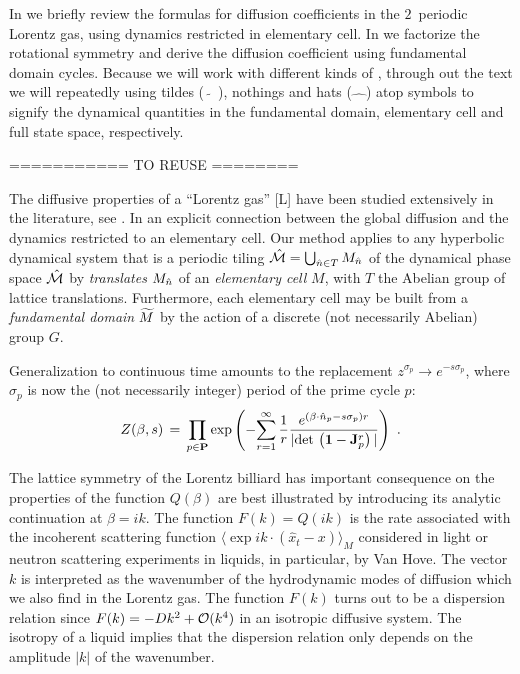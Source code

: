 
In  we briefly review the formulas for diffusion
coefficients in the $2$\dmn\ periodic Lorentz gas, using dynamics
restricted in elementary cell. In we
factorize the rotational symmetry and derive the diffusion coefficient
using fundamental domain cycles. Because we will work with different
kinds of \statesp, through out the text we will repeatedly using tildes
($\tilde{\quad}$), nothings and hats ($\hat{\quad}$) atop symbols to
signify the dynamical quantities in the fundamental domain, elementary
cell and full state space, respectively.


=========== TO REUSE ========


The diffusive properties of a ``Lorentz gas'' [L]
have been studied extensively in the literature,
see .
In   an explicit
connection between the global diffusion and the dynamics restricted to
an elementary cell.
Our method applies to any  hyperbolic dynamical system that is
a periodic tiling $\hat {{\cal M}}=\bigcup_{ \hat n \in T} M_{
\hat n}$
of the dynamical phase space $\hat {{\cal M}}$ by {\sl translates}
$M_{\hat n}$
of an {\sl elementary cell} $M$, with $T$ the Abelian group of lattice
translations.
Furthermore, each elementary cell may be built from a
{\sl fundamental domain}
${\widetilde M}$
by the action of a discrete (not necessarily Abelian) group $G$.

                                                            \toCB
Generalization to continuous time amounts to the replacement
$ z^{\sigma_p} \rightarrow e^{-s \sigma_p} $,
where $\sigma_p$ is now the (not necessarily integer)
period of the prime cycle $p$:
$$
Z(\beta,s)\,=\,\prod_{p\in\PP} \exp \left( - {
 \sum_{r=1}^\infty {1 \over r}
 { e^{(\beta \cdot \hn_p- s \sigma_p) r } %
 \over { | \det \left( {\bf 1}-{\bf J}_p^{r} \right) | } }
 } \right)
\,\, .
$$

The lattice symmetry of the Lorentz billiard has important consequence on
the properties of the function $Q(\beta)$ are best illustrated by introducing
its analytic continuation at $\beta = i k$.  The function $F(k)=Q(ik)$ is the
rate associated with the incoherent scattering function $\langle \exp i k
\cdot (\hat x_t - x) \rangle_M$ considered in light or
neutron scattering experiments in liquids, in particular, by Van Hove.
The vector $k$ is interpreted as the wavenumber of the hydrodynamic modes of
diffusion which we also find in the Lorentz gas.  The function $F(k)$ turns
out to be a dispersion relation since $F(k)=-D k^2 + {\cal O}(k^4)$ in an
isotropic diffusive system.  The isotropy of a liquid implies that the
dispersion relation only depends on the amplitude $\vert k\vert$ of the
wavenumber.


